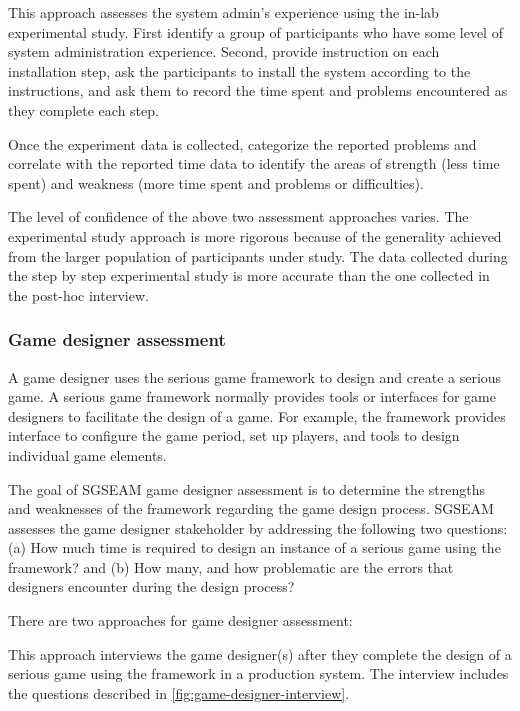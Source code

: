 \label{In-lab system admin study}

This approach assesses the system admin's experience using the in-lab experimental study. First identify a group 
of participants who have some level of system administration experience. Second, provide instruction on 
each installation step, ask the participants to install the system according to the instructions, and ask them to record 
the time spent and problems encountered as they complete each step.

Once the experiment data is collected, categorize the reported problems and correlate with the reported time data 
to identify the areas of strength (less time spent) and weakness (more time spent and problems or difficulties). 

The level of confidence of the above two assessment approaches varies. The experimental study
approach is more rigorous because of the generality achieved from the larger population of
participants under study. The data collected during the step by step experimental study is more
accurate than the one collected in the post-hoc interview.

\subsubsection{Game designer assessment}

A game designer uses the serious game framework to design and create a serious game.
A serious game framework normally provides tools or interfaces for game designers
to facilitate the design of a game. For example, the framework provides interface to configure the game period, set up 
players, and tools to design individual game elements.

The goal of SGSEAM game designer assessment is to determine the strengths and weaknesses of the framework 
regarding the game design process. SGSEAM assesses the game designer stakeholder by addressing the following 
two questions: (a) How much time is required to design an instance of a serious game using the framework? and (b) How
many, and how problematic are the errors that designers encounter during the design process?

There are two approaches for game designer assessment:

\label{Post-hoc game designer interview}

This approach interviews the game designer(s) after they complete the design of a serious game using the 
framework in a production system. The interview includes the questions described in \autoref{fig:game-designer-interview}.
 

